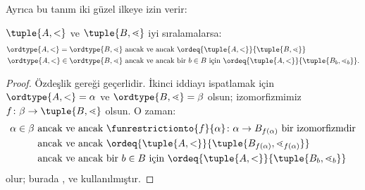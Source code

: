 \documentclass[../../../include/open-logic-section]{subfiles}
\begin{document}
Ayrıca bu tanım iki güzel ilkeye izin verir:

\begin{cor}
$\tuple{A,<}$ ve $\tuple{B,\lessdot}$ iyi sıralamalarsa:
\begin{align*}
	\ordtype{A, <} = \ordtype{B, \lessdot}&\text{ ancak ve ancak }\ordeq{\tuple{A, <}}{\tuple{B, \lessdot}}\\
	\ordtype{A, <} \in \ordtype{B, \lessdot}&\text{ ancak ve ancak bir }b \in B\text{ için }\ordeq{\tuple{A, <}}{\tuple{B_b, \lessdot_b}}.
\end{align*}
\end{cor}

\begin{proof}
Özdeşlik  gereği geçerlidir. İkinci iddiayı
ispatlamak için $\ordtype{A,<}=\alpha$ ve
$\ordtype{B,\lessdot}=\beta$ olsun; izomorfizmimiz
$f\colon\beta\to\tuple {B,\lessdot}$ olsun. O zaman:
\begin{align*}
	\alpha \in \beta&\text{ ancak ve ancak }\funrestrictionto{f}{\alpha} \colon \alpha \to B_{f(\alpha)}\text{ bir izomorfizmdir}\\
	&\text{ ancak ve ancak }\ordeq{\tuple{A, <}}{\tuple{B_{f(\alpha)}, \lessdot_{f(\alpha)}}}\\
	&\text{ ancak ve ancak bir $b \in B$ için }\ordeq{\tuple{A, <}}{\tuple{B_b, \lessdot_b}}
\end{align*}
olur; burada ,
 ve
 kullanılmıştır.
\end{proof}
\end{document}
